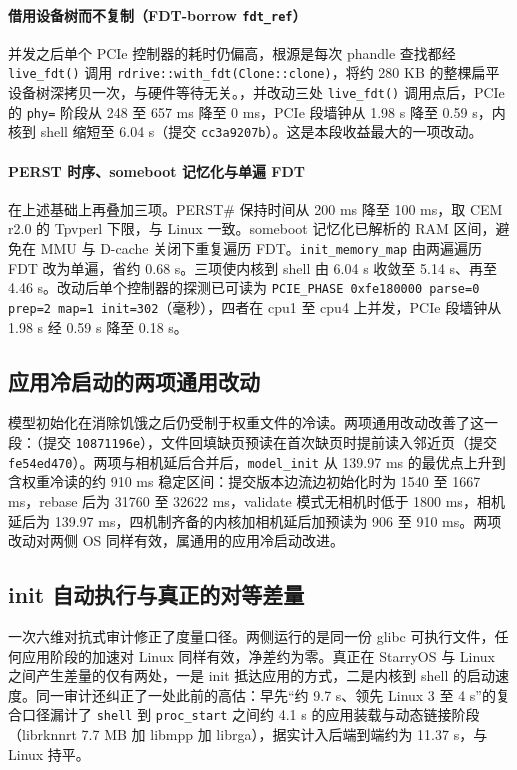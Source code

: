\paragraph{借用设备树而不复制（FDT-borrow \texttt{fdt\_ref}）}
并发之后单个 PCIe 控制器的耗时仍偏高，根源是每次 phandle 查找都经 \texttt{live\_fdt()} 调用 \texttt{rdrive::with\_fdt(Clone::clone)}，将约 280 KB 的整棵扁平设备树深拷贝一次，与硬件等待无关。，并改动三处 \texttt{live\_fdt()} 调用点后，PCIe 的 \texttt{phy=} 阶段从 248 至 657 ms 降至 0 ms，PCIe 段墙钟从 1.98 s 降至 0.59 s，内核到 shell 缩短至 6.04 s（提交 \texttt{cc3a9207b}）。这是本段收益最大的一项改动。

\paragraph{PERST 时序、someboot 记忆化与单遍 FDT}
在上述基础上再叠加三项。PERST\# 保持时间从 200 ms 降至 100 ms，取 CEM r2.0 的 Tpvperl 下限，与 Linux 一致。someboot 记忆化已解析的 RAM 区间，避免在 MMU 与 D-cache 关闭下重复遍历 FDT。\texttt{init\_memory\_map} 由两遍遍历 FDT 改为单遍，省约 0.68 s。三项使内核到 shell 由 6.04 s 收敛至 5.14 s、再至 4.46 s。改动后单个控制器的探测已可读为 \texttt{PCIE\_PHASE 0xfe180000 parse=0 prep=2 map=1 init=302}（毫秒），四者在 cpu1 至 cpu4 上并发，PCIe 段墙钟从 1.98 s 经 0.59 s 降至 0.18 s。

\subsection{应用冷启动的两项通用改动}

模型初始化在消除饥饿之后仍受制于权重文件的冷读。两项通用改动改善了这一段：（提交 \texttt{10871196e}），文件回填缺页预读在首次缺页时提前读入邻近页（提交 \texttt{fe54ed470}）。两项与相机延后合并后，\texttt{model\_init} 从 139.97 ms 的最优点上升到含权重冷读的约 910 ms 稳定区间：提交版本边流边初始化时为 1540 至 1667 ms，rebase 后为 31760 至 32622 ms，validate 模式无相机时低于 1800 ms，相机延后为 139.97 ms，四机制齐备的内核加相机延后加预读为 906 至 910 ms。两项改动对两侧 OS 同样有效，属通用的应用冷启动改进。

\subsection{init 自动执行与真正的对等差量}

一次六维对抗式审计修正了度量口径。两侧运行的是同一份 glibc 可执行文件，任何应用阶段的加速对 Linux 同样有效，净差约为零。真正在 StarryOS 与 Linux 之间产生差量的仅有两处，一是 init 抵达应用的方式，二是内核到 shell 的启动速度。同一审计还纠正了一处此前的高估：早先“约 9.7 s、领先 Linux 3 至 4 s”的复合口径漏计了 \texttt{shell} 到 \texttt{proc\_start} 之间约 4.1 s 的应用装载与动态链接阶段（librknnrt 7.7 MB 加 libmpp 加 librga），据实计入后端到端约为 11.37 s，与 Linux 持平。

